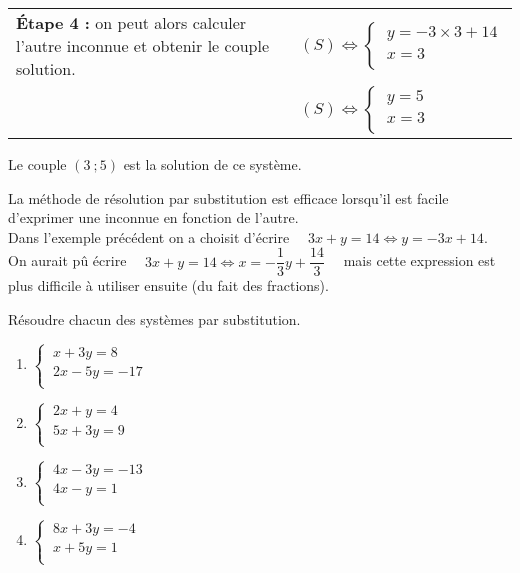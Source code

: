 \documentclass[a4paper,11pt,cours]{nsi}
\begin{document}
\begin{methode}[ ]
\begin{tabular}{p{9cm}p{7cm}}
		\textbf{\'Etape 4 :} on	peut alors calculer l'autre inconnue et obtenir le couple solution. & $(S) \Leftrightarrow \left\{
		\begin{array}{l}
			\ y=-3\times3+14 \\
			\ x=3 \\
		\end{array} \right.$\\
		& $(S) \Leftrightarrow \left\{
		\begin{array}{l}
			\ y=5 \\
			\ x=3 \\
		\end{array} \right.$\\
	\end{tabular}
	Le couple $(3\ ;5)$ est la solution de ce système.
\end{methode}

\begin{remarque}[s]
	La méthode de résolution par substitution est efficace lorsqu'il est facile d'exprimer une inconnue en fonction de l'autre.\\
	Dans l'exemple précédent on a choisit d'écrire $\quad 3x+y=14 \Leftrightarrow y=-3x+14$.\\
	On aurait pû écrire  $\quad 3x+y=14 \Leftrightarrow x=-\dfrac{1}{3}y+\dfrac{14}{3}\quad$ mais cette expression est plus difficile à utiliser ensuite (du fait des fractions).
\end{remarque}

\begin{exercice}[ ]
	
	\begin{multicols}{3}
		Résoudre chacun des systèmes par substitution.\\
		\vspace{1cm}
		\begin{enumerate}
			\item 		$\left\{
			\begin{array}{l}
				\ x+3y=8 \\
				\ 2x-5y=-17\\
			\end{array} \right.$
			\item 		$\left\{
			\begin{array}{l}
				\ 2x+y=4 \\
				\ 5x+3y=9 \\
			\end{array} \right.$	
			\item 		$\left\{
			\begin{array}{l}
				\ 4x-3y=-13 \\
				\ 4x-y=1 \\
			\end{array} \right.$
			\item 		$\left\{
			\begin{array}{l}
				\ 8x+3y=-4 \\
				\ x+5y=1 \\
			\end{array} \right.$
		\end{enumerate}
	\end{multicols}
\end{exercice}
\end{document}
